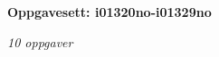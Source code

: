 \centerline{\bf Oppgavesett: i01320no-i01329no}
\vskip 10pt
\centerline{\it 10 oppgaver}\vskip 10pt
\vskip 10pt
